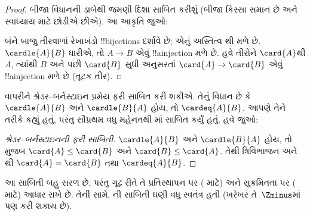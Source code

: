 \documentclass[../../../include/open-logic-section]{subfiles}
\begin{document}
\begin{proof}
બીજા વિધાનની ડાબેથી જમણી દિશા સાબિત કરીશું
(બીજા કિસ્સા સમાન છે અને સ્વાધ્યાય માટે છોડીએ છીએ).
આ આકૃતિ જુઓ:
\begin{center}
\end{center}
બંને બાજુ તીરવાળાં રેખાખંડો !!{bijection}s દર્શાવે છે;
એનું અસ્તિત્વ થી મળે છે.
$\cardle{A}{B}$ ધારીએ, તો $A\to B$ એવું
!!a{injection} મળે છે. હવે તીરોને $\card{A}$થી
$A$, ત્યાંથી $B$ અને પછી $\card{B}$ સુધી અનુસરતાં
$\card{A} \to \card{B}$ એવું !!a{injection} મળે
છે (તૂટક તીર).
\end{proof}\noindent {} વાપરીને
શ્રેડર--બર્નસ્ટાઇન પ્રમેય ફરી સાબિત કરી શકીએ.
તેનું વિધાન છે કે $\cardle{A}{B}$ અને
$\cardle{B}{A}$ હોય, તો $\cardeq{A}{B}$.
આપણે તેને 
તરીકે કહ્યું હતું, પરંતુ સૌપ્રથમ વધુ મહેનતથી
માં સાબિત કર્યું હતું.
હવે જુઓ:

\begin{proof}[શ્રેડર--બર્નસ્ટાઇનની ફરી સાબિતી]
$\cardle{A}{B}$ અને $\cardle{B}{A}$ હોય, તો
 મુજબ
$\card{A} \leq \card{B}$ અને
$\card{B} \leq \card{A}$. તેથી ત્રિવિભાજન અને
થી
$\card{A} = \card{B}$ તથા $\cardeq{A}{B}$.
\end{proof}
\noindent
આ સાબિતી બહુ સરળ છે, પરંતુ ગૂઢ રીતે તે
પ્રતિસ્થાપન પર
(
માટે) અને સુક્રમિતતા પર
( માટે)
આધાર રાખે છે. તેની સામે,
ની સાબિતી
ઘણી વધુ સ્વતંત્ર હતી (ખરેખર તે~$\Zminus$માં પણ
કરી શકાય છે).
\end{document}
